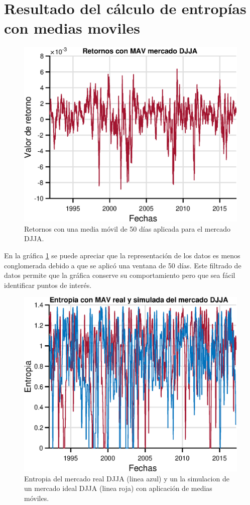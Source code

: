 \section{Resultado del cálculo de entropías con medias moviles}



\begin{figure}[h]
	\centering
	\includegraphics[width=0.7\linewidth]{figures/MAVreturnseps}
	\caption{Retornos con una media móvil de 50 días aplicada para el mercado DJJA.}
	\label{fig:mavreturnseps}
\end{figure}

En la gráfica \ref{fig:mavreturnseps} se puede apreciar que la representación de los datos es menos conglomerada debido a que se aplicó una ventana de 50 días. Este filtrado de datos permite que la gráfica conserve su comportamiento pero que sea fácil identificar puntos de interés.

\begin{figure}[h]
	\centering
	\includegraphics[width=0.7\linewidth]{figures/MAVentropy}
	\caption{Entropia del mercado real DJJA (linea azul) y un la simulacion de un mercado ideal DJJA (linea roja) con aplicación de medias móviles.}
	\label{fig:maventropy}
\end{figure}

